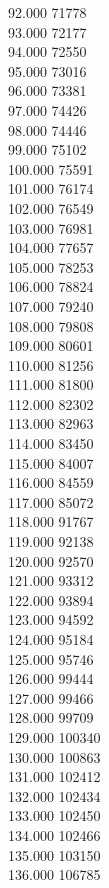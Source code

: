 { 92.000	71778 \\
 93.000	72177 \\
 94.000	72550 \\
 95.000	73016 \\
 96.000	73381 \\
 97.000	74426 \\
 98.000	74446 \\
 99.000	75102 \\
 100.000	75591 \\
 101.000	76174 \\
 102.000	76549 \\
 103.000	76981 \\
 104.000	77657 \\
 105.000	78253 \\
 106.000	78824 \\
 107.000	79240 \\
 108.000	79808 \\
 109.000	80601 \\
 110.000	81256 \\
 111.000	81800 \\
 112.000	82302 \\
 113.000	82963 \\
 114.000	83450 \\
 115.000	84007 \\
 116.000	84559 \\
 117.000	85072 \\
 118.000	91767 \\
 119.000	92138 \\
 120.000	92570 \\
 121.000	93312 \\
 122.000	93894 \\
 123.000	94592 \\
 124.000	95184 \\
 125.000	95746 \\
 126.000	99444 \\
 127.000	99466 \\
 128.000	99709 \\
 129.000	100340 \\
 130.000	100863 \\
 131.000	102412 \\
 132.000	102434 \\
 133.000	102450 \\
 134.000	102466 \\
 135.000	103150 \\
 136.000	106785 \\
}
